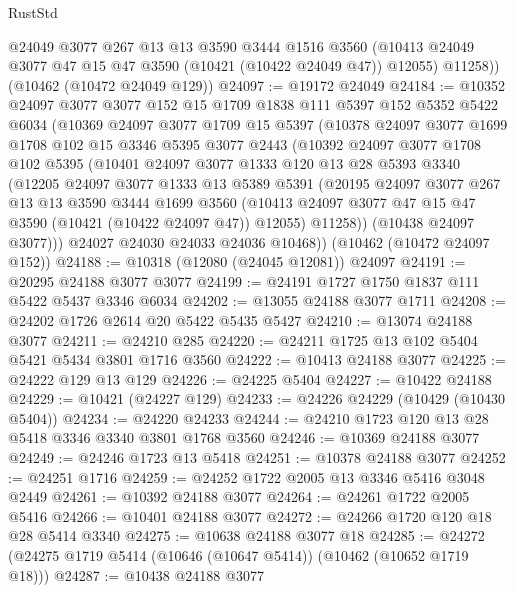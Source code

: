 \begin{lexlean}{RustStd}
\begin{coremodule}
        @24049
        @3077
        @267
        @13
        @13
        @3590
        @3444
        @1516
        @3560
        (@10413 @24049 @3077 @47 @15 @47 @3590 (@10421 (@10422 @24049 @47)) @12055)
        @11258))
    (@10462 (@10472 @24049 @129))
@24097 := @19172 @24049
@24184 := @10352
    @24097
    @3077
    @3077
    @152
    @15
    @1709
    @1838
    @111
    @5397
    @152
    @5352
    @5422
    @6034
    (@10369
      @24097
      @3077
      @1709
      @15
      @5397
      (@10378
        @24097
        @3077
        @1699
        @1708
        @102
        @15
        @3346
        @5395
        @3077
        @2443
        (@10392
          @24097
          @3077
          @1708
          @102
          @5395
          (@10401
            @24097
            @3077
            @1333
            @120
            @13
            @28
            @5393
            @3340
            (@12205
              @24097
              @3077
              @1333
              @13
              @5389
              @5391
              (@20195
                @24097
                @3077
                @267
                @13
                @13
                @3590
                @3444
                @1699
                @3560
                (@10413 @24097 @3077 @47 @15 @47 @3590 (@10421 (@10422 @24097 @47)) @12055)
                @11258))
            (@10438 @24097 @3077)))
        @24027
        @24030
        @24033
        @24036
        @10468))
    (@10462 (@10472 @24097 @152))
@24188 := @10318 (@12080 (@24045 @12081)) @24097
@24191 := @20295 @24188 @3077 @3077
@24199 := @24191 @1727 @1750 @1837 @111 @5422 @5437 @3346 @6034
@24202 := @13055 @24188 @3077 @1711
@24208 := @24202 @1726 @2614 @20 @5422 @5435 @5427
@24210 := @13074 @24188 @3077
@24211 := @24210 @285
@24220 := @24211 @1725 @13 @102 @5404 @5421 @5434 @3801 @1716 @3560
@24222 := @10413 @24188 @3077
@24225 := @24222 @129 @13 @129
@24226 := @24225 @5404
@24227 := @10422 @24188
@24229 := @10421 (@24227 @129)
@24233 := @24226 @24229 (@10429 (@10430 @5404))
@24234 := @24220 @24233
@24244 := @24210 @1723 @120 @13 @28 @5418 @3346 @3340 @3801 @1768 @3560
@24246 := @10369 @24188 @3077
@24249 := @24246 @1723 @13 @5418
@24251 := @10378 @24188 @3077
@24252 := @24251 @1716
@24259 := @24252 @1722 @2005 @13 @3346 @5416 @3048 @2449
@24261 := @10392 @24188 @3077
@24264 := @24261 @1722 @2005 @5416
@24266 := @10401 @24188 @3077
@24272 := @24266 @1720 @120 @18 @28 @5414 @3340
@24275 := @10638 @24188 @3077 @18
@24285 := @24272 (@24275 @1719 @5414 (@10646 (@10647 @5414)) (@10462 (@10652 @1719 @18)))
@24287 := @10438 @24188 @3077

\end{coremodule}
\end{lexlean}
